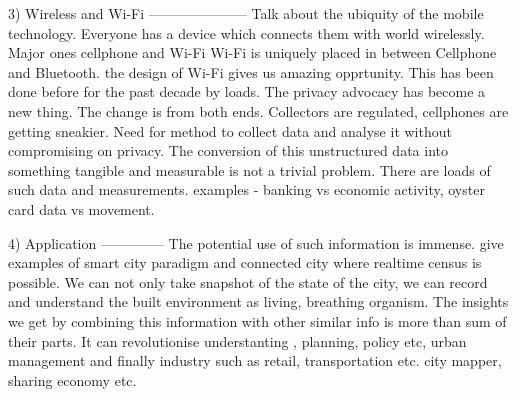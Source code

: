 3) Wireless and Wi-Fi
---------------------
Talk about the ubiquity of the mobile technology. Everyone has a device
which connects them with world wirelessly. Major ones cellphone and Wi-Fi
Wi-Fi is uniquely placed in between Cellphone and Bluetooth. the design
of Wi-Fi gives us amazing opprtunity. This has been done before for the past
decade by loads. The privacy advocacy has become a new thing. The change is
from both ends. Collectors are regulated, cellphones are getting sneakier.
Need for method to collect data and analyse it without compromising on privacy.
The conversion of this unstructured data into something tangible and measurable
is not a trivial problem. There are loads of such data and measurements.
examples - banking vs economic activity, oyster card data vs movement.

4) Application
--------------
The potential use of such information is immense. give examples of
smart city paradigm and connected city where realtime census is possible.
We can not only take snapshot of the state of the city, we can record and
understand the built environment as living, breathing organism. 
The insights we get by combining this information with other similar
info is more than sum of their parts. It can revolutionise understanting
, planning, policy etc, urban management and finally industry such as
retail, transportation etc. city mapper, sharing economy etc.
